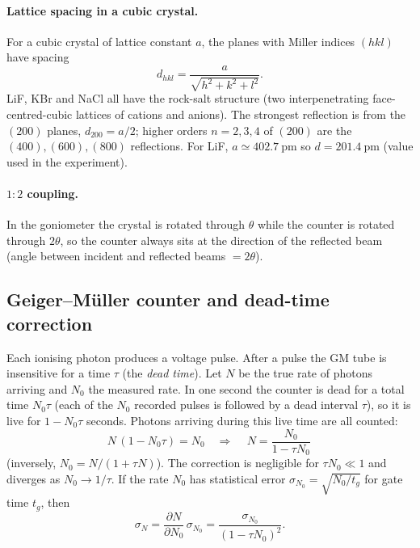 \documentclass[11pt,a4paper]{article}
\begin{document}
\paragraph{Lattice spacing in a cubic crystal.} For a cubic crystal of lattice constant $a$, the planes with Miller indices $(hkl)$ have spacing
\begin{equation}
d_{hkl}=\frac{a}{\sqrt{h^2+k^2+l^2}} .
\end{equation}
LiF, KBr and NaCl all have the rock-salt structure (two interpenetrating face-centred-cubic lattices of cations and anions). The strongest reflection is from the $(200)$ planes, $d_{200}=a/2$; higher orders $n=2,3,4$ of $(200)$ are the $(400),(600),(800)$ reflections. For LiF, $a\simeq\SI{402.7}{\pico\metre}$ so $d=\SI{201.4}{\pico\metre}$ (value used in the experiment).

\paragraph{$1{:}2$ coupling.} In the goniometer the crystal is rotated through $\theta$ while the counter is rotated through $2\theta$, so the counter always sits at the direction of the reflected beam (angle between incident and reflected beams $=2\theta$).

\subsection{Geiger--M\"uller counter and dead-time correction}
Each ionising photon produces a voltage pulse. After a pulse the GM tube is insensitive for a time $\tau$ (the \emph{dead time}). Let $N$ be the true rate of photons arriving and $N_0$ the measured rate. In one second the counter is dead for a total time $N_0\tau$ (each of the $N_0$ recorded pulses is followed by a dead interval $\tau$), so it is live for $1-N_0\tau$ seconds. Photons arriving during this live time are all counted:
\begin{equation}
N\,(1-N_0\tau)=N_0
\quad\Longrightarrow\quad
\boxed{\,N=\frac{N_0}{1-\tau N_0}\,}
\label{eq:dead}
\end{equation}
(inversely, $N_0=N/(1+\tau N)$). The correction is negligible for $\tau N_0\ll1$ and diverges as $N_0\to1/\tau$. If the rate $N_0$ has statistical error $\sigma_{N_0}=\sqrt{N_0/t_g}$ for gate time $t_g$, then
\begin{equation}
\sigma_N=\frac{\partial N}{\partial N_0}\,\sigma_{N_0}=\frac{\sigma_{N_0}}{(1-\tau N_0)^2}.
\label{eq:sigmaN}
\end{equation}
\end{document}
